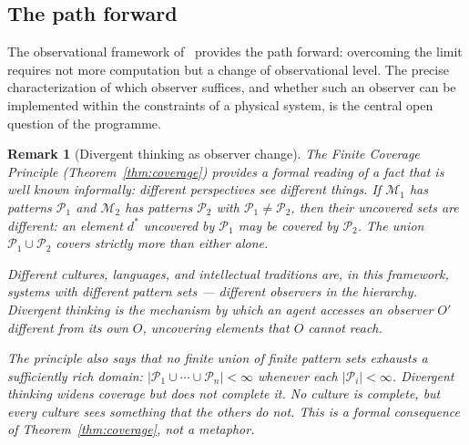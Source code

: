 \documentclass[11pt]{article}
\newtheorem{remark}[theorem]{Remark}
\begin{document}
\smallskip

\subsection{The path forward}

The observational framework of~\cite{buono2026framework,buono2026observer}
provides the path forward: overcoming the limit requires not more
computation but a change of observational level. The precise
characterization of which observer suffices, and whether such an
observer can be implemented within the constraints of a physical system,
is the central open question of the programme.

\medskip

\begin{remark}[Divergent thinking as observer change]
\label{rem:divergent}
The Finite Coverage Principle (Theorem~\ref{thm:coverage}) provides a
formal reading of a fact that is well known informally: different
perspectives see different things. If $\mathcal{M}_1$ has patterns
$\mathcal{P}_1$ and $\mathcal{M}_2$ has patterns $\mathcal{P}_2$ with
$\mathcal{P}_1 \neq \mathcal{P}_2$, then their uncovered sets are
different: an element $d^*$ uncovered by $\mathcal{P}_1$ may be covered
by $\mathcal{P}_2$. The union $\mathcal{P}_1 \cup \mathcal{P}_2$ covers
strictly more than either alone.

\smallskip

Different cultures, languages, and intellectual traditions are, in this
framework, systems with different pattern sets --- different observers
in the hierarchy. Divergent thinking is the mechanism by which an agent
accesses an observer $O'$ different from its own $O$, uncovering
elements that $O$ cannot reach.

\smallskip

The principle also says that no finite union of finite pattern sets
exhausts a sufficiently rich domain:
$|\mathcal{P}_1 \cup \cdots \cup \mathcal{P}_n| < \infty$ whenever
each $|\mathcal{P}_i| < \infty$. Divergent thinking \emph{widens}
coverage but does not \emph{complete} it. No culture is complete, but
every culture sees something that the others do not. This is a formal
consequence of Theorem~\ref{thm:coverage}, not a metaphor.

\smallskip


\end{remark}
\end{document}
